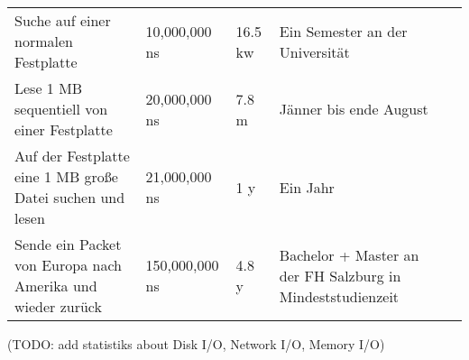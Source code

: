 \begin{table}[h]
\begin{tabular}{@{}lllll@{}}
Suche auf einer normalen Festplatte                        & 10,000,000 ns                 & 16.5 kw                        & Ein Semester an der Universität                            &  \\
Lese 1 MB sequentiell von einer Festplatte                 & 20,000,000 ns                 & 7.8 m                          & Jänner bis ende August                                     &  \\
Auf der Festplatte eine 1 MB große Datei suchen und lesen  & 21,000,000 ns                 & 1 y                            & Ein Jahr                                                   &  \\
Sende ein Packet von Europa nach Amerika und wieder zurück & 150,000,000 ns                & 4.8 y                          & Bachelor + Master an der FH Salzburg in Mindeststudienzeit &  \\ \bottomrule
\end{tabular}
\end{table}



(TODO: add statistiks about Disk I/O, Network I/O, Memory I/O)
